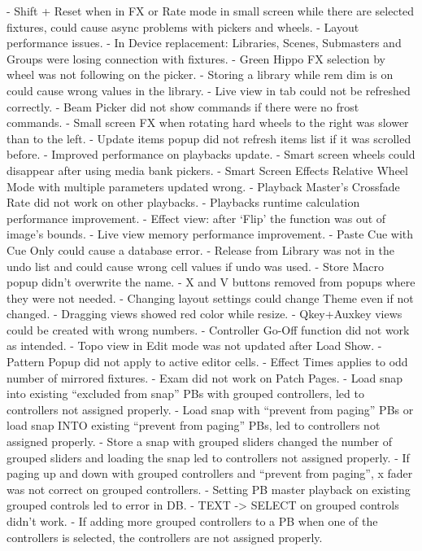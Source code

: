 \documentclass[
]{article}
\begin{document}
- Shift + Reset when in FX or Rate mode in small screen while there are selected fixtures, could cause async problems with pickers and wheels.
- Layout performance issues.
- In Device replacement: Libraries, Scenes, Submasters and Groups were losing connection with fixtures.
- Green Hippo FX selection by wheel was not following on the picker.
- Storing a library while rem dim is on could cause wrong values in the library.
- Live view in tab could not be refreshed correctly.
- Beam Picker did not show commands if there were no frost commands.
- Small screen FX when rotating hard wheels to the right was slower than to the left.
- Update items popup did not refresh items list if it was scrolled before.
- Improved performance on playbacks update.
- Smart screen wheels could disappear after using media bank pickers.
- Smart Screen Effects Relative Wheel Mode with multiple parameters updated wrong.
- Playback Master's Crossfade Rate did not work on other playbacks.
- Playbacks runtime calculation performance improvement.
- Effect view: after `Flip' the function was out of image's bounds.
- Live view memory performance improvement.
- Paste Cue with Cue Only could cause a database error.
- Release from Library was not in the undo list and could cause wrong cell values if undo was used.
- Store Macro popup didn't overwrite the name.
- X and V buttons removed from popups where they were not needed.
- Changing layout settings could change Theme even if not changed.
- Dragging views showed red color while resize.
- Qkey+Auxkey views could be created with wrong numbers.
- Controller Go-Off function did not work as intended.
- Topo view in Edit mode was not updated after Load Show.
- Pattern Popup did not apply to active editor cells.
- Effect Times applies to odd number of mirrored fixtures.
- Exam did not work on Patch Pages.
- Load snap into existing ``excluded from snap'' PBs with grouped controllers, led to controllers not assigned properly.
- Load snap with ``prevent from paging'' PBs or load snap INTO existing ``prevent from paging'' PBs, led to controllers not assigned properly.
- Store a snap with grouped sliders changed the number of grouped sliders and loading the snap led to controllers not assigned properly.
- If paging up and down with grouped controllers and ``prevent from paging'', x fader was not correct on grouped controllers.
- Setting PB master playback on existing grouped controls led to error in DB.
- TEXT -\textgreater{} SELECT on grouped controls didn't work.
- If adding more grouped controllers to a PB when one of the controllers is selected, the controllers are not assigned properly.
\end{document}
